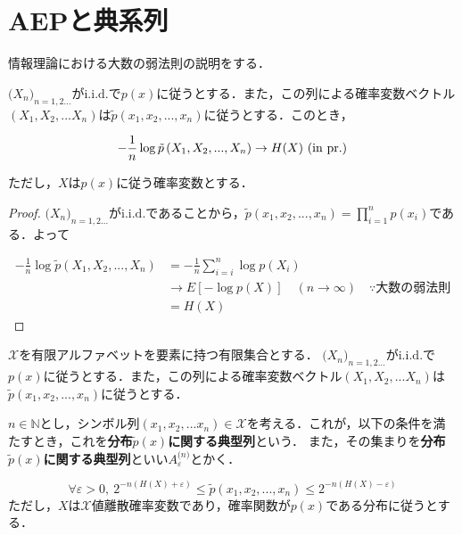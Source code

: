 \documentclass{classes/myclass}
\begin{document}
\section{AEPと典系列}

情報理論における大数の弱法則の説明をする．

\begin{thm}[AEP]
$\lparen X_n \rparen_{n = 1, 2...}$が$\mathrm{i.i.d.}$で$p(x)$に従うとする．また，この列による確率変数ベクトル$(X_1, X_2, ... X_n)$は$\tilde{p}(x_1, x_2, ..., x_n)$に従うとする．このとき，

\[
  -\frac{1}{n} \log \tilde{p}\left \lparen X_1, X_2, ..., X_n \right \rparen \rightarrow H(X) \ (\mathrm{in \ pr.})
\]

ただし，$X$は$p(x)$に従う確率変数とする．
\end{thm}

\begin{proof}
$\lparen X_n \rparen_{n = 1, 2...}$が$\mathrm{i.i.d.}$であることから，$\tilde{p}(x_1, x_2, ..., x_n) = \prod_{i = 1}^{n}p(x_i)$である．よって

\begin{align*}
  -\frac{1}{n} \log \tilde{p}(X_1, X_2, ..., X_n) &= -\frac{1}{n} \sum_{i = i}^{n} \log p(X_i) \label{form-num:check-identicality}\\
  &\rightarrow E[-\log p(X)] \quad (n \to \infty) \quad \because \text{大数の弱法則} \\
  &= H(X)
\end{align*}
\end{proof}


\begin{dfn}[典系列]
$\mathcal{X}$を有限アルファベットを要素に持つ有限集合とする．
$\lparen X_n \rparen_{n = 1, 2...}$が$\mathrm{i.i.d.}$で$p(x)$に従うとする．また，この列による確率変数ベクトル$(X_1, X_2, ... X_n)$は$\tilde{p}(x_1, x_2, ..., x_n)$に従うとする．

$n \in \mathbb{N}$とし，シンボル列$(x_1, x_2,... x_n) \in \mathcal{X}$を考える．これが，以下の条件を満たすとき，これを\textbf{分布$\tilde{p}(x)$に関する典型列}という．
また，その集まりを\textbf{分布$\tilde{p}(x)$に関する典型列}といい$A_{\varepsilon}^{\lparen n \rparen}$とかく．

\[
  \forall \varepsilon > 0, \  2^{-n(H(X) + \varepsilon)} \leq \tilde{p}(x_1, x_2, ..., x_n) \leq  2^{-n(H(X) - \varepsilon)}
\]
ただし，$X$は$\mathcal{X}$値離散確率変数であり，確率関数が$p(x)$である分布に従うとする．
\end{dfn}
\end{document}
